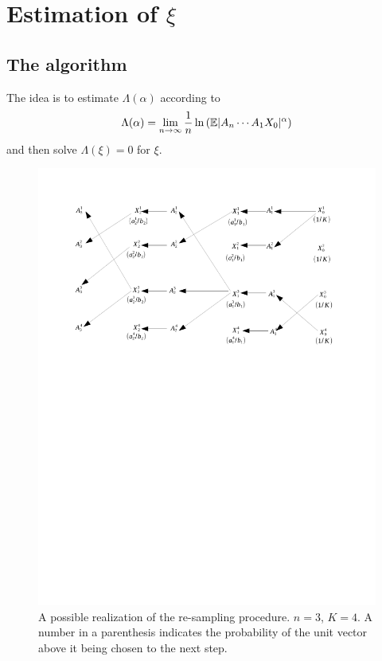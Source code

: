 \documentclass[aoas,preprint]{imsart}
\numberwithin{equation}{section}
\theoremstyle{plain}
\begin{document}
\section[Estimation of xi]{Estimation of $\xi$}
\subsection{The algorithm}
The idea is to estimate $\Lambda(\alpha)$ according to
\begin{equation}
  \label{eq:Lambda}
  \Lambda(\alpha) = \lim_{n \to \infty}{1 \over n} \ln \left(
    \mathbb{E} |A_n \cdots A_1 X_0|^\alpha
  \right)
\end{equation}
and then solve $\Lambda(\xi) = 0$ for $\xi$.
\begin{figure}[htb!]
  \centering
  \includegraphics[width=\linewidth, trim=2cm 16cm 2.5cm 2cm, clip]{AnandsEstimator.pdf}
  \caption{A possible realization of the re-sampling procedure. $n =
    3$, $K = 4$. A number in a parenthesis indicates the probability
    of the unit vector above it being chosen to the next step.}
  \label{fig:AnandsEstimator}
\end{figure}
\end{document}
